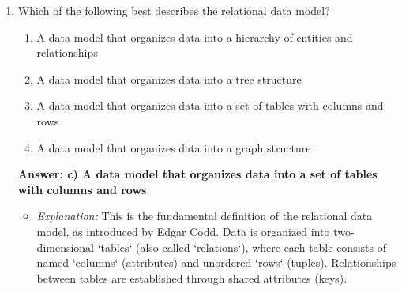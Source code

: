 \documentclass{article}
\begin{document}
\begin{enumerate}[label=\textbf{Question \arabic*.}]
\item Which of the following best describes the relational data model?
    \begin{enumerate}[label=\alph*)]
        \item A data model that organizes data into a hierarchy of entities and relationships
        \item A data model that organizes data into a tree structure
        \item A data model that organizes data into a set of tables with columns and rows
        \item A data model that organizes data into a graph structure
    \end{enumerate}
    \textbf{Answer: c) A data model that organizes data into a set of tables with columns and rows}
    \begin{itemize}
        \item \textit{Explanation:} This is the fundamental definition of the relational data model, as introduced by Edgar Codd. Data is organized into two-dimensional `tables` (also called `relations`), where each table consists of named `columns` (attributes) and unordered `rows` (tuples). Relationships between tables are established through shared attributes (keys).
    \end{itemize}


\end{enumerate}
\end{document}
